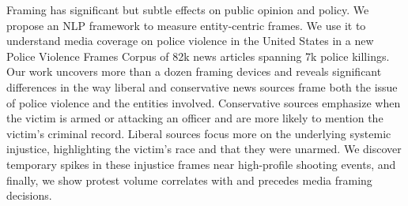 Framing has significant but subtle effects on public opinion and policy. We propose an NLP framework to measure entity-centric frames. We use it to understand media coverage on police violence in the United States in a new Police Violence Frames Corpus of 82k news articles spanning 7k police killings. Our work  uncovers more than a dozen framing devices and reveals significant differences in the way liberal and conservative news sources frame both the issue of police violence and the entities involved. Conservative sources emphasize when the victim is armed or attacking an officer and are more likely to mention the victim's criminal record. Liberal sources focus more on the underlying systemic injustice, highlighting the victim's race and that they were unarmed. We discover temporary spikes in these injustice frames near high-profile shooting events, and finally, we show protest volume correlates with and precedes media framing decisions.
